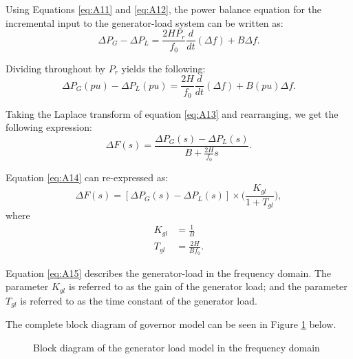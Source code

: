 Using Equations \ref{eq:A11} and \ref{eq:A12}, the power balance equation for the incremental input to the generator-load system can be written as:
\begin{equation}
	\Delta P_G - \Delta P_L = \frac{2 H P_r}{f_0} \frac{d}{dt} (\Delta f) + B \Delta f.
\end{equation}

Dividing throughout by $P_r$ yields the following:
\begin{equation}
	\Delta P_G(pu) - \Delta P_L(pu) = \frac{2 H}{f_0} \frac{d}{dt} (\Delta f) + B(pu) \Delta f. \label{eq:A13}
\end{equation}

Taking the Laplace transform of equation \ref{eq:A13} and rearranging, we get the following expression:
\begin{equation}
	\Delta F(s) = \frac{\Delta P_G(s) - \Delta P_L(s)}{B + \frac{2H}{f_0}s}. \label{eq:A14}
\end{equation}

Equation \ref{eq:A14} can re-expressed as:
\begin{equation}
	\Delta F(s) = [\Delta P_G(s) - \Delta P_L(s)] \times \bigg( \frac{K_{gl}}{1 + T_{gl}} \bigg), \label{eq:A15}
\end{equation}
where
\begin{align}
K_{gl} &= \frac{1}{B} \\
T_{gl} &= \frac{2H}{B f_0}.
\end{align}

Equation \ref{eq:A15} describes the generator-load in the frequency domain. The parameter $K_{gl}$ is referred to as the gain of the generator load; and the parameter $T_{gl}$ is referred to as the time constant of the generator load.

The complete block diagram of governor model can be seen in Figure \ref{fig:A06_generator_load_model} below.

\begin{figure}[h]
	\centering
	
	\caption[Generator-load model]{Block diagram of the generator load model in the frequency domain}
	\label{fig:A06_generator_load_model}
\end{figure}